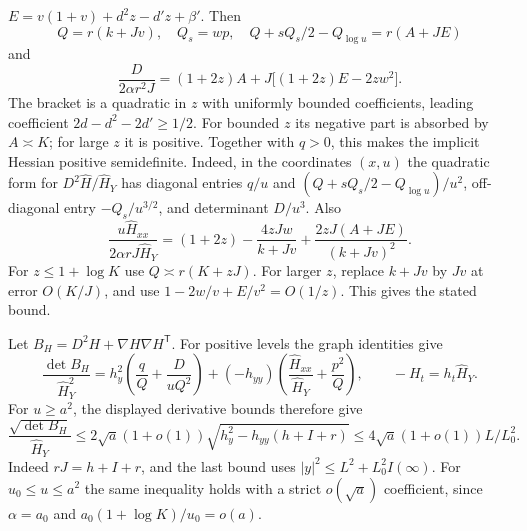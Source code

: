 \documentclass[11pt]{article}
\newcommand{\1}{\mathbf{1}}
\numberwithin{equation}{section}
\begin{document}
\(E=v(1+v)+d^2z-d'z+\beta'\). Then
\[
 Q=r(k+Jv),\quad Q_s=wp,\quad Q+sQ_s/2-Q_{\log u}=r(A+JE)
\]
and
\[
 \frac{D}{2\alpha r^2J}=(1+2z)A+J\big[(1+2z)E-2zw^2\big].
\]
The bracket is a quadratic in \(z\) with uniformly bounded
coefficients, leading coefficient \(2d-d^2-2d'\ge1/2\).
For bounded \(z\) its negative part is absorbed by \(A\asymp K\);
for large \(z\) it is positive. Together with \(q>0\), this makes the implicit Hessian positive
semidefinite. Indeed, in the coordinates \((x,u)\) the quadratic
form for \(D^2\widehat H/\widehat H_Y\) has diagonal entries
\(q/u\) and \((Q+sQ_s/2-Q_{\log u})/u^2\), off-diagonal
entry \(-Q_s/u^{3/2}\), and determinant \(D/u^3\). Also
\[
 \frac{u\widehat H_{xx}}{2\alpha rJ\widehat H_Y}
 =(1+2z)-\frac{4zJw}{k+Jv}
           +\frac{2zJ(A+JE)}{(k+Jv)^2}.
\]
For \(z\le1+\log K\) use \(Q\asymp r(K+zJ)\). For larger \(z\),
replace \(k+Jv\) by \(Jv\) at error \(O(K/J)\), and use
\(1-2w/v+E/v^2=O(1/z)\). This gives the stated bound.

Let \(B_H=D^2H+\nabla H\nabla H^{\mathsf T}\).
For positive levels the graph identities give
\[
 \frac{\det B_H}{\widehat H_Y^2}
 = h_y^2\left(\frac qQ+\frac{D}{uQ^2}\right)
  +(-h_{yy})\left(\frac{\widehat H_{xx}}{\widehat H_Y}+\frac{p^2}Q\right),
 \qquad -H_t=h_t\widehat H_Y.
\]
For \(u\ge a^2\), the displayed derivative bounds therefore give
\[
 \frac{\sqrt{\det B_H}}{\widehat H_Y}
 \le 2\sqrt a(1+o(1))
        \sqrt{h_y^2-h_{yy}(h+I+r)}
 \le 4\sqrt a(1+o(1))L/L_0^2.
\]
Indeed \(rJ=h+I+r\), and the last bound uses
\(|y|^2\le L^2+L_0^2 I(\infty)\).
For \(u_0\le u\le a^2\) the same inequality holds with a
strict \(o(\sqrt a)\) coefficient, since \(\alpha=a_0\)
and \(a_0(1+\log K)/u_0=o(a)\).
\end{document}
